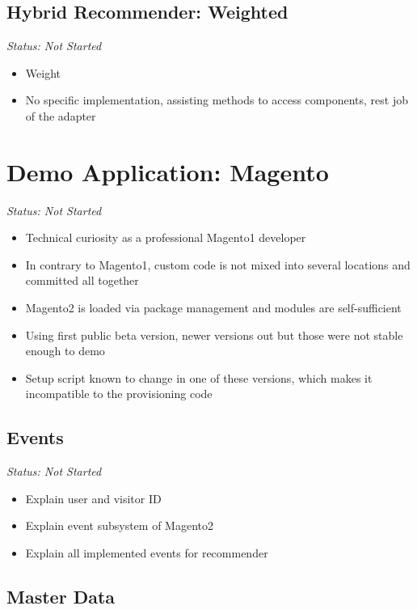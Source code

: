 \subsection{Hybrid Recommender: Weighted}

\emph{Status: Not Started}

\begin{itemize}
\item Weight
\item No specific implementation, assisting methods to access components, rest job of the adapter
\end{itemize}

\section{Demo Application: Magento}

\emph{Status: Not Started}

\begin{itemize}
\item Technical curiosity as a professional Magento1 developer
\item In contrary to Magento1, custom code is not mixed into several locations and committed all together
\item Magento2 is loaded via package management and modules are self-sufficient
\item Using first public beta version, newer versions out but those were not stable enough to demo
\item Setup script known to change in one of these versions, which makes it incompatible to the provisioning code
\end{itemize}

\subsection{Events}

\emph{Status: Not Started}

\begin{itemize}
\item Explain user and visitor ID
\item Explain event subsystem of Magento2
\item Explain all implemented events for recommender
\end{itemize}

\subsection{Master Data}

